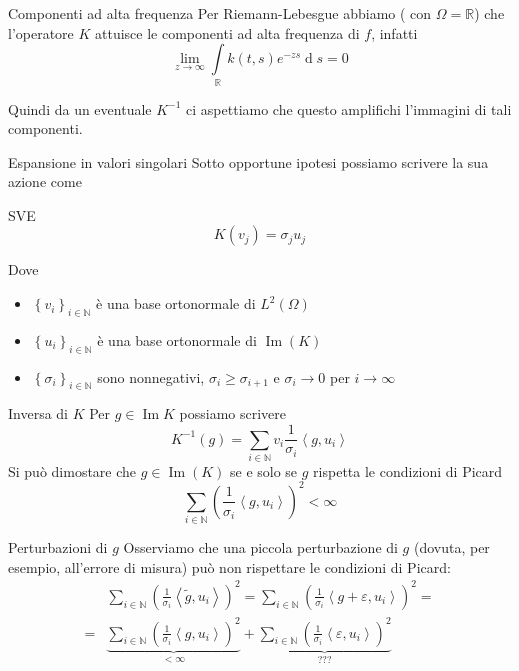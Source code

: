 \documentclass{beamer}
\theoremstyle{plain}
\theoremstyle{definition}
\theoremstyle{remark}
\newcommand{\set}[1]{\left\{#1\right\}}
\newcommand{\pa}[1]{\left(#1\right)}
\newcommand{\ang}[1]{\left<#1\right>}
\newcommand{\intl}{\int \limits}
\DeclareMathOperator{\de}{d}
\DeclareMathOperator{\im}{Im}
\begin{document}
\begin{frame}{Componenti ad alta frequenza}
  Per Riemann-Lebesgue abbiamo ( con $\Omega = \mathbb{R}$) che
  l'operatore $K$ attuisce le componenti ad alta frequenza di $f$,
  infatti
  \[ \lim _{z \to \infty} \intl _\mathbb{R} k(t,s) e^{-zs} \de s =
  0 \]

  Quindi da un eventuale $K^{-1}$ ci aspettiamo che questo amplifichi
  l'immagini di tali componenti.
\end{frame}

\begin{frame}{Espansione in valori singolari}
  Sotto opportune ipotesi possiamo scrivere la sua azione come
  \begin{block}{SVE}
    \[ K(v_j) = \sigma _j u_j \]
  \end{block}
  Dove
  \begin{itemize}
  \item $\set{v_i}_{i\in \mathbb{N}}$ è una base ortonormale di
    $L^2(\Omega)$
  \item $\set{u_i}_{i\in \mathbb{N}}$ è una base ortonormale di
    $\im(K)$
  \item $\set{\sigma _i}_{i\in \mathbb{N}}$ sono nonnegativi, $\sigma
    _i \ge \sigma _{i+1}$ e $\sigma _i \to 0$ per $i \to \infty$
  \end{itemize}
\end{frame}

\begin{frame}{Inversa di $K$}
  Per $g \in \im{K}$ possiamo scrivere
  \[ K^{-1}(g) = \sum _{i\in \mathbb{N}} v_i \frac{1}{\sigma _i}
  \ang{g,u_i} \]
  \vfill
  Si può dimostare che $g\in \im (K)$ se e solo se $g$ rispetta le
  condizioni di Picard
  \[ \sum _{i\in \mathbb{N}} \pa{ \frac{1}{\sigma _i} \ang{g,u_i}} ^2
  < \infty \]
\end{frame}

\begin{frame}{Perturbazioni di $g$}
  Osserviamo che una piccola perturbazione di $g$ (dovuta, per
  esempio, all'errore di misura) può non rispettare le condizioni di
  Picard:
  \begin{align*}
    & \sum _{i\in \mathbb{N}} \pa{ \frac{1}{\sigma _i} \ang{\tilde
        g,u_i}} ^2 = \sum _{i\in \mathbb{N}} \pa{ \frac{1}{\sigma _i}
      \ang{g + \varepsilon,u_i}} ^2
    = \\
    =&\underbrace{\sum _{i\in \mathbb{N}} \pa{
          \frac{1}{\sigma _i} \ang{g,u_i}} ^2} _{<\infty}
    + \underbrace{\sum _{i\in \mathbb{N}} \pa{ \frac{1}{\sigma _i}
      \ang{\varepsilon,u_i}} ^2} _{???}
  \end{align*}
\end{frame}
\end{document}
